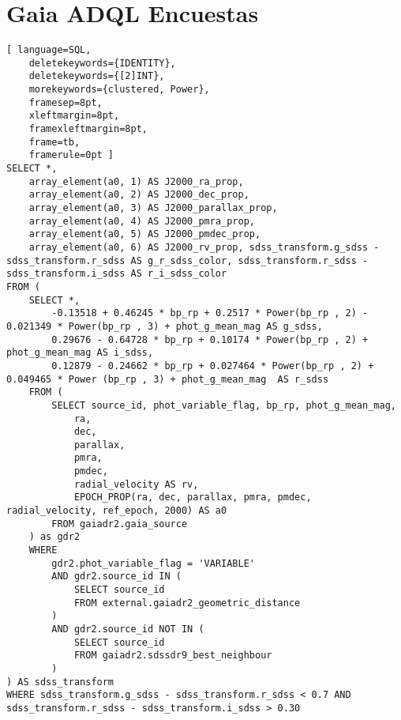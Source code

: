 \chapter{Gaia ADQL Encuestas}

\begin{lstlisting}[ language=SQL,
	deletekeywords={IDENTITY},
	deletekeywords={[2]INT},
	morekeywords={clustered, Power},
	framesep=8pt,
	xleftmargin=8pt,
	framexleftmargin=8pt,
	frame=tb,
	framerule=0pt ]
SELECT *, 
	array_element(a0, 1) AS J2000_ra_prop,
	array_element(a0, 2) AS J2000_dec_prop,
	array_element(a0, 3) AS J2000_parallax_prop,
	array_element(a0, 4) AS J2000_pmra_prop,
	array_element(a0, 5) AS J2000_pmdec_prop,
	array_element(a0, 6) AS J2000_rv_prop, sdss_transform.g_sdss - sdss_transform.r_sdss AS g_r_sdss_color, sdss_transform.r_sdss - sdss_transform.i_sdss AS r_i_sdss_color
FROM (
	SELECT *,
		-0.13518 + 0.46245 * bp_rp + 0.2517 * Power(bp_rp , 2) - 0.021349 * Power(bp_rp , 3) + phot_g_mean_mag AS g_sdss,
		0.29676 - 0.64728 * bp_rp + 0.10174 * Power(bp_rp , 2) + phot_g_mean_mag AS i_sdss,
		0.12879 - 0.24662 * bp_rp + 0.027464 * Power(bp_rp , 2) +	0.049465 * Power (bp_rp , 3) + phot_g_mean_mag	AS r_sdss
	FROM (
		SELECT source_id, phot_variable_flag, bp_rp, phot_g_mean_mag,
			ra,
			dec,
			parallax,
			pmra,
			pmdec,
			radial_velocity AS rv,
			EPOCH_PROP(ra, dec, parallax, pmra, pmdec, radial_velocity, ref_epoch, 2000) AS a0
		FROM gaiadr2.gaia_source
	) as gdr2
	WHERE
		gdr2.phot_variable_flag = 'VARIABLE'
		AND gdr2.source_id IN (
			SELECT source_id
			FROM external.gaiadr2_geometric_distance
		)
		AND gdr2.source_id NOT IN (
			SELECT source_id
			FROM gaiadr2.sdssdr9_best_neighbour
		)
) AS sdss_transform
WHERE sdss_transform.g_sdss - sdss_transform.r_sdss < 0.7 AND sdss_transform.r_sdss - sdss_transform.i_sdss > 0.30
\end{lstlisting}